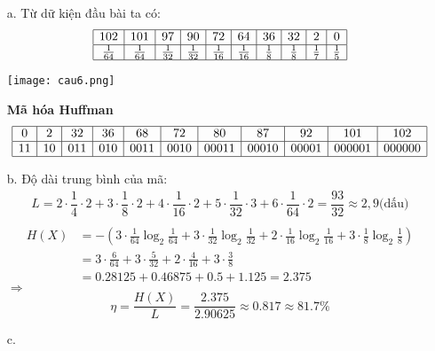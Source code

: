 \documentclass[12pt]{article}
\begin{document}
\begin{itemize}
    \item [a.] Từ dữ kiện đầu bài ta có:
    \[
    \begin{array}{|c|c|c|c|c|c|c|c|c|c|c|}
    \hline
    102 & 101 & 97 & 90 & 72 & 64 & 36 & 32 & 2 & 0 \\
    \hline
    \frac{1}{64} & \frac{1}{64} & \frac{1}{32} & \frac{1}{32} & \frac{1}{16} & \frac{1}{16} & \frac{1}{8} & \frac{1}{8} & \frac{1}{7} & \frac{1}{5} \\
    \hline
    \end{array}
    \]
     \begin{center}
        \texttt{[image: cau6.png]}
    \end{center}   

   \begin{center}
    \textbf{Mã hóa Huffman}
    \[
    \begin{array}{|c|c|c|c|c|c|c|c|c|c|c|}
    \hline
    0 & 2 & 32 & 36 & 68 & 72 & 80 & 87 & 92 & 101 & 102 \\
    \hline
    11 & 10 & 011 & 010 & 0011 & 0010 & 00011 & 00010 & 00001 & 000001 & 000000 \\
    \hline
    \end{array}
    \]
    \end{center}
    \item[b.] Độ dài trung bình của mã:
    \begin{align*}
        L  = 2 \cdot \dfrac{1}{4}\cdot 2 + 3 \cdot \dfrac{1}{8}\cdot2 + 4 \cdot \dfrac{1}{16}\cdot 2 + 5 \cdot \dfrac{1}{32}\cdot 3 + 6\cdot \dfrac{1}{64}\cdot2 =\dfrac{93}{32} \approx 2,9\text{(dấu)} \\
    \end{align*}
    \[
    \begin{aligned}
    H(X) &= -\left( 3 \cdot \frac{1}{64} \log_2 \frac{1}{64} + 3 \cdot \frac{1}{32} \log_2 \frac{1}{32} + 2 \cdot \frac{1}{16} \log_2 \frac{1}{16} + 3 \cdot \frac{1}{8} \log_2 \frac{1}{8} \right) \\
    &= 3 \cdot \frac{6}{64} + 3 \cdot \frac{5}{32} + 2 \cdot \frac{4}{16} + 3 \cdot \frac{3}{8} \\
    &= 0.28125 + 0.46875 + 0.5 + 1.125 = 2.375
    \end{aligned}
    \]
    $\Rightarrow$ \\
    \[
    \eta = \frac{H(X)}{L} = \frac{2.375}{2.90625} \approx 0.817 \approx 81.7\%
    \]
    \item[c. ] 

\end{itemize}
\end{document}
